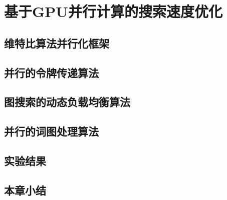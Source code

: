 
\chapter{基于GPU并行计算的搜索速度优化}
\label{chap:gpu}
\section{维特比算法并行化框架}
\label{chap:gpu-viterbi}
\section{并行的令牌传递算法}
\label{chap:gpu-token}
\section{图搜索的动态负载均衡算法}
\label{chap:gpu-loadbalance}
\section{并行的词图处理算法}
\label{chap:gpu-lattice}
\section{实验结果}
\label{chap:gpu-exp}
\section{本章小结}
\label{chap:gpu-sum}